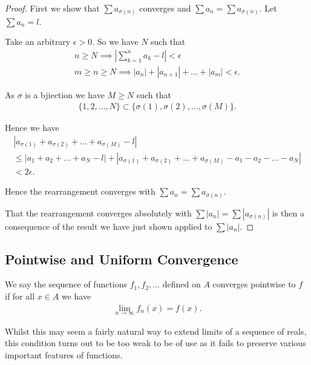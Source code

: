 \documentclass[]{article}
\begin{document}
\begin{proof}
		First we show that $\sum a_{\sigma(n)}$ converges and $\sum a_n = \sum a_{\sigma(n)}$. Let $\sum a_n = l$.

		Take an arbitrary $\epsilon > 0$. So we have $N$ such that
		\begin{align*}
				n \geq N \implies |\sum_{k=1}^n a_k - l| < \epsilon \\
				m \geq n \geq N \implies |a_n| + |a_{n+1}| + \ldots + |a_m| < \epsilon.
		\end{align*}

		As $\sigma$ is a bjiection we have $M \geq N$ such that 
		\begin{align*}
				\{1,2,\ldots,N\} \subset \{\sigma(1), \sigma(2), \ldots, \sigma(M)\}.
		\end{align*}

		Hence we have
		\begin{align*}
				|a_{\sigma(1)} + a_{\sigma(2)} + \ldots + a_{\sigma(M)} - l| \\
				\leq |a_1 + a_2 + \ldots + a_N - l| + |a_{\sigma(1)} + a_{\sigma(2)} + \ldots + a_{\sigma(M)} - a_1 - a_2 - \ldots - a_N| \\
				< 2\epsilon.
		\end{align*}

		Hence the rearrangement converges with $\sum a_n = \sum a_{\sigma(n)}$.

		That the rearrangement converges absolutely with $\sum |a_n| = \sum |a_{\sigma(n)}|$ is then a consequence of the result we have just shown applied to $\sum |a_n|$.
\end{proof}

\subsection{Pointwise and Uniform Convergence}

\begin{defi} 
	We say the sequence of functions $f_1, f_2, \ldots$ defined on $A$ converges pointwise to $f$ if for all $x \in A$ we have
	\begin{align*}
			\lim_{n \to \infty} f_n(x) = f(x).
	\end{align*}
\end{defi}

Whilst this may seem a fairly natural way to extend limits of a sequence of reals, this condition turns out to be too weak to be of use as it fails to preserve various important features of functions.
\end{document}
